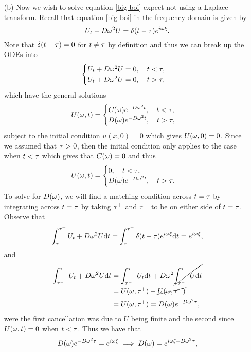 \documentclass[12pt]{report}
\begin{document}
\begin{solution}
\begin{enumerate}
        \item[(b)]
        Now we wish to solve equation \ref{big boi} expect not using a Laplace transform. Recall that equation \ref{big boi} in the frequency domain is given by
        \[ 
            U_t + D {\omega}^2 U = \delta(t - {\tau}) e^{i{\omega}{\xi}}.
        \]
        Note that $\delta(t - {\tau}) = 0$ for $t \neq {\tau}$ by definition and thus we can break up the ODEs into
        \[ 
            \begin{cases}
                U_t + D {\omega}^2 U = 0, \quad t < {\tau},\\
                U_t + D {\omega}^2 U = 0, \quad t > {\tau},
            \end{cases}
        \]
        which have the general solutions
        \[ 
            U({\omega},t) = \begin{cases}
                C({\omega}) e^{-D{\omega}^2 t}, \quad t < {\tau},\\
                D({\omega}) e^{-D{\omega}^2 t}, \quad t > {\tau},\\
            \end{cases}
        \]
        subject to the initial condition $u(x,0)=0$ which gives $U({\omega},0) = 0$. Since we assumed that ${\tau} > 0$, then the initial condition only applies to the case when $t < {\tau}$ which gives that $C({\omega}) = 0$ and thus 
        \[ 
            U({\omega},t) = \begin{cases}
                0, \quad t < {\tau},\\
                D({\omega}) e^{-D{\omega}^2 t}, \quad t > {\tau}.\\
            \end{cases}
        \]
        To solve for $D({\omega})$, we will find a matching condition across $t = {\tau}$ by integrating across $t = {\tau}$ by taking ${\tau}^+$ and ${\tau}^-$ to be on either side of $t = {\tau}$. Observe that
        \[ 
            \int_{{\tau}^-}^{{\tau}^+} U_t + D {\omega}^2 U  {\mathrm{d}} t = \int_{{\tau}^-}^{{\tau}^+} \delta(t - {\tau}) e^{i{\omega}{\xi}} {\mathrm{d}} t = e^{i{\omega}{\xi}},
        \] 
        and
        \begin{align*}
            \int_{{\tau}^-}^{{\tau}^+} U_t + D {\omega}^2 U  {\mathrm{d}} t &= \int_{{\tau}^-}^{{\tau}^+} U_t {\mathrm{d}} t + D {\omega}^2 \cancel{\int_{{\tau}^-}^{{\tau}^+} U  {\mathrm{d}} t}\\
            &= U({\omega},{\tau}^+) - \cancel{U({\omega},{\tau}^-)}\\
            &= U({\omega},{\tau}^+) = D({\omega})e^{-D{\omega}^2 {\tau}},
        \end{align*}
        were the first cancellation was due to $U$ being finite and the second since $U({\omega},t) = 0$ when $t < {\tau}$.
        Thus we have that
        \[ 
            D({\omega})e^{-D{\omega}^2 {\tau}} = e^{i{\omega}{\xi}} \implies D({\omega}) = e^{i{\omega}{\xi} + D{\omega}^2{\tau}},
\]
\end{enumerate}
\end{solution}
\end{document}
